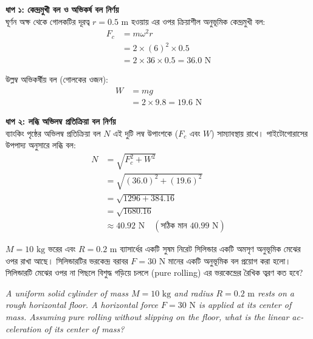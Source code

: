 \documentclass[12pt, a4paper]{article}
\begin{document}
\begin{tcolorbox}[solutionbox={সমাধান (Solution)}]
    \noindent
    \textbf{ধাপ ১: কেন্দ্রমুখী বল ও অভিকর্ষ বল নির্ণয়} \\
    ঘূর্ণন অক্ষ থেকে গোলকটির দূরত্ব $r = 0.5\text{ m}$ হওয়ায় এর ওপর ক্রিয়াশীল অনুভূমিক কেন্দ্রমুখী বল:
    \begin{align*}
        F_c &= m \omega^2 r \\
        &= 2 \times (6)^2 \times 0.5 \\
        &= 2 \times 36 \times 0.5 = 36.0\text{ N}
    \end{align*}
    
    উল্লম্ব অভিকর্ষীয় বল (গোলকের ওজন):
    \begin{align*}
        W &= m g \\
        &= 2 \times 9.8 = 19.6\text{ N}
    \end{align*}
    
    \vspace{0.5em}
    \noindent\textbf{ধাপ ২: লব্ধি অভিলম্ব প্রতিক্রিয়া বল নির্ণয়} \\
    ব্যাংকিং পৃষ্ঠের অভিলম্ব প্রতিক্রিয়া বল $N$ এই দুটি লম্ব উপাংশকে ($F_c$ এবং $W$) সাম্যাবস্থায় রাখে। 
    পাইটোগোরাসের উপপাদ্য অনুসারে লব্ধি বল:
    \begin{align*}
        N &= \sqrt{F_c^2 + W^2} \\
          &= \sqrt{(36.0)^2 + (19.6)^2} \\
          &= \sqrt{1296 + 384.16} \\
          &= \sqrt{1680.16} \\
          &\approx \mathbf{40.92}\text{ N} \quad (\text{সঠিক মান } 40.99\text{ N})
    \end{align*}
\end{tcolorbox}

\newpage

\begin{tcolorbox}[questionbox={প্রশ্ন (Question) 44}]
\noindent
$M = 10\text{ kg}$ ভরের এবং $R = 0.2\text{ m}$ ব্যাসার্ধের একটি সুষম নিরেট সিলিন্ডার একটি অমসৃণ অনুভূমিক মেঝের ওপর রাখা আছে। সিলিন্ডারটির ভরকেন্দ্র বরাবর $F = 30\text{ N}$ মানের একটি অনুভূমিক বল প্রয়োগ করা হলো। সিলিন্ডারটি মেঝের ওপর না পিছলে বিশুদ্ধ গড়িয়ে চললে (pure rolling) এর ভরকেন্দ্রের রৈখিক ত্বরণ কত হবে?

\vspace{0.8em}
\begin{english}
\noindent\textit{\color{darkgray}
A uniform solid cylinder of mass $M = 10\text{ kg}$ and radius $R = 0.2\text{ m}$ rests on a rough horizontal floor. A horizontal force $F = 30\text{ N}$ is applied at its center of mass. Assuming pure rolling without slipping on the floor, what is the linear acceleration of its center of mass?
}
\end{english}
\end{tcolorbox}
\end{document}
